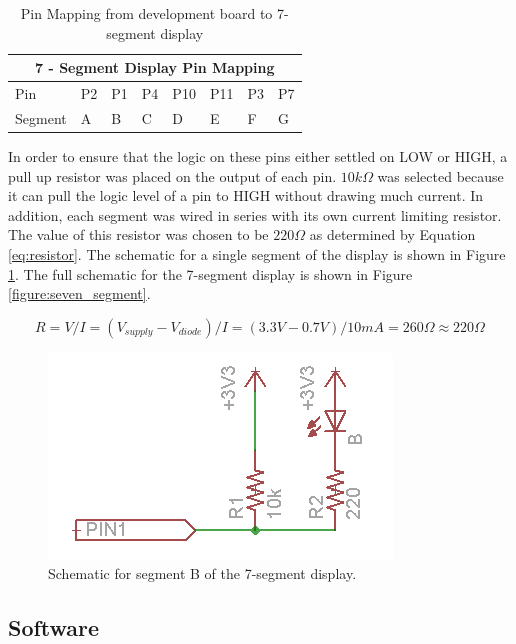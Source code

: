\documentclass[11pt]{article}
\begin{document}
\begin{table}[h]
\label{tb:pin_mapping}
\center
\begin{tabular}{|l|l|l|l|l|l|l|l|}
\hline
\multicolumn{8}{|c|}{7 - Segment Display Pin Mapping} \\ \hline
Pin       & P2  & P1  & P4  & P10  & P11  & P3  & P7  \\ \hline
Segment   & A   & B   & C   & D    & E    & F   & G   \\ \hline
\end{tabular}
\caption{Pin Mapping from development board to 7-segment display}
\end{table}


In order to ensure that the logic on these pins either settled on LOW or HIGH, a pull up resistor was placed on the output of each pin. $10k\Omega$ was selected because it can pull the logic level of a pin to HIGH without drawing much current. In addition, each segment was wired in series with its own current limiting resistor. The value of this resistor was chosen to be $220\Omega$ as determined by Equation \ref{eq:resistor}. The schematic for a single segment of the display is shown in Figure \ref{figure:single_led}. The full schematic for the 7-segment display is shown in Figure \ref{figure:seven_segment}. 


\begin{equation}
\label{eq:resistor}
R = V/I
  = (V_{supply}-V_{diode})/I
  = (3.3V - 0.7V)/10mA
  = 260\Omega
 \approx 220\Omega
\end{equation} 
		
\begin{figure}[h!]
\centering
\includegraphics[scale=0.7]{single_led.png}
\caption{Schematic for segment B of the 7-segment display.}
\label{figure:single_led}
\end{figure} 


\subsection{Software}
\end{document}
